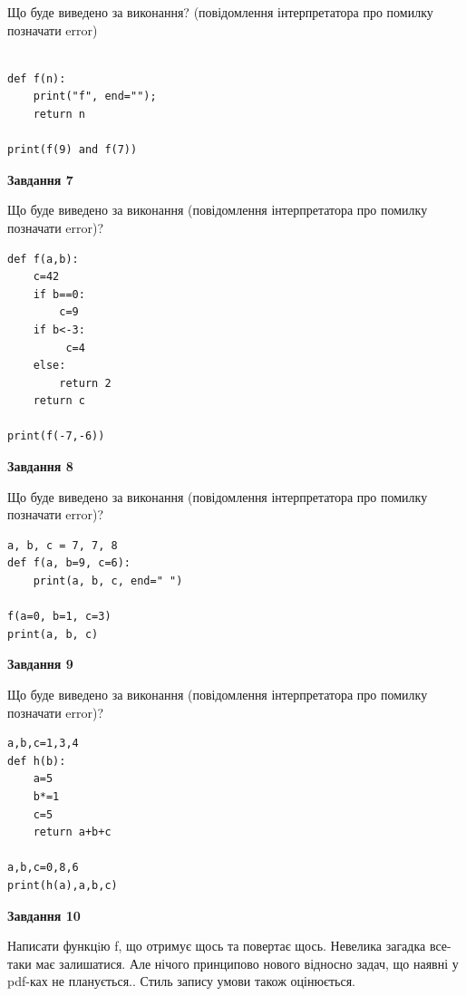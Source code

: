 \documentclass[12pt, ukrainian]{article}
\begin{document}
{\begin {large}
Що буде виведено за виконання? (повідомлення інтерпретатора про помилку позначати error)\par
\begin{verbatim}

def f(n):
    print("f", end="");
    return n

print(f(9) and f(7))
\end{verbatim}

{\begin {center}\textbf{Завдання 7}\end {center}}

Що буде виведено за виконання (повідомлення інтерпретатора про помилку позначати error)?\par
\begin{verbatim}
def f(a,b):
    c=42
    if b==0:
        c=9
    if b<-3:
         c=4
    else: 
        return 2
    return c

print(f(-7,-6))
\end{verbatim}

{\begin {center}\textbf{Завдання 8}\end {center}}

Що буде виведено за виконання (повідомлення інтерпретатора про помилку позначати error)?\par
\begin{verbatim}
a, b, c = 7, 7, 8
def f(a, b=9, c=6):
    print(a, b, c, end=" ")

f(a=0, b=1, c=3)
print(a, b, c)
\end{verbatim}

{\begin {center}\textbf{Завдання 9}\end {center}}

Що буде виведено за виконання (повідомлення інтерпретатора про помилку позначати error)?\par
\begin{verbatim}
a,b,c=1,3,4
def h(b):
    a=5
    b*=1
    c=5
    return a+b+c

a,b,c=0,8,6
print(h(a),a,b,c)
\end{verbatim}

{\begin {center}\textbf{Завдання 10}\end {center}}


Написати функцiю f, що отримує щось та повертає щось. Невелика загадка все-таки має залишатися. Але нічого принципово нового відносно задач, що наявні у pdf-ках не планується.. Стиль запису умови також оцінюється.\par
\end {large}}
\newpage
\end{document}
